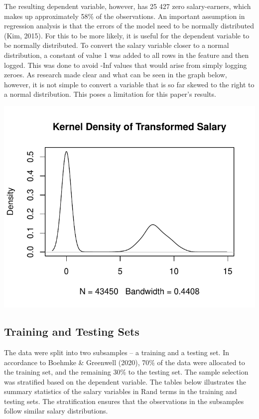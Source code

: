 \documentclass[11pt,preprint, authoryear]{elsarticle}
\numberwithin{equation}{section}
\numberwithin{figure}{section}
\numberwithin{table}{section}
\begin{document}
The resulting dependent variable, however, has 25 427 zero
salary-earners, which makes up approximately 58\% of the observations.
An important assumption in regression analysis is that the errors of the
model need to be normally distributed (Kim, 2015). For this to be more
likely, it is useful for the dependent variable to be normally
distributed. To convert the salary variable closer to a normal
distribution, a constant of value 1 was added to all rows in the feature
and then logged. This was done to avoid -Inf values that would arise
from simply logging zeroes. As research made clear and what can be seen
in the graph below, however, it is not simple to convert a variable that
is so far skewed to the right to a normal distribution. This poses a
limitation for this paper's results.

\begin{center}\includegraphics{MLPDF_files/figure-latex/unnamed-chunk-4-1} \end{center}

\hypertarget{training-and-testing-sets}{%
\subsection{Training and Testing Sets}\label{training-and-testing-sets}}

The data were split into two subsamples -- a training and a testing set.
In accordance to Boehmke \& Greenwell (2020), 70\% of the data were
allocated to the training set, and the remaining 30\% to the testing
set. The sample selection was stratified based on the dependent
variable. The tables below illustrates the summary statistics of the
salary variables in Rand terms in the training and testing sets. The
stratification ensures that the observations in the subsamples follow
similar salary distributions.
\end{document}
